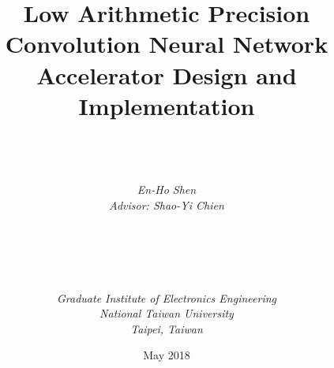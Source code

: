 \documentclass[a4paper, 12pt, twoside, openright]{mythesis}
\begin{document}
\title{\textbf{Low Arithmetic Precision Convolution Neural Network Accelerator Design and Implementation}}


\author{ \\  \\ \\
{\it En-Ho Shen}\\
{\it Advisor: Shao-Yi Chien} \\ \\ \\ \\  \\ \\
{\it Graduate Institute of Electronics Engineering}\\
{\it National Taiwan University} \\
{\it Taipei, Taiwan}\\ }

{\date{May 2018}}

\maketitle

\frontmatter

\tableofcontents
\listoffigures
\listoftables


\mainmatter











\end{document}
